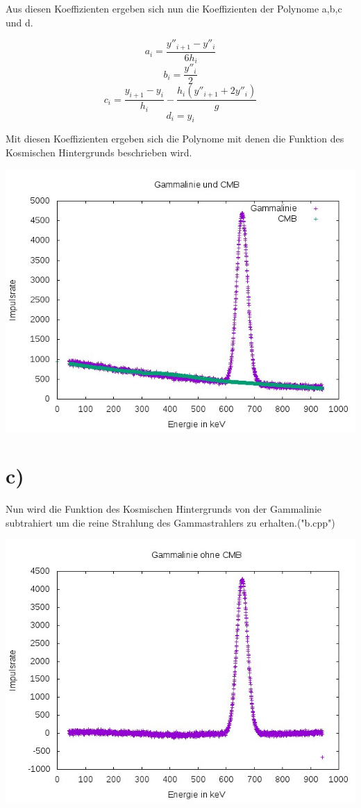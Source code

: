 \documentclass{scrreprt}
\begin{document}
Aus diesen Koeffizienten ergeben sich nun die Koeffizienten der Polynome a,b,c und d.

\[a_i = \frac{y''_{i+1}-y''_i}{6h_i}\]
\[b_i = \frac{y''_i}{2}\]
\[c_i = \frac{y_{i+1}-y_i}{h_i}-\frac{h_i(y''_{i+1}+2y''_i)}{g}\]
\[d_i = y_i\]

Mit diesen Koeffizienten ergeben sich die Polynome mit denen die Funktion des Kosmischen Hintergrunds beschrieben wird.

\begin{center}
	\includegraphics*[scale=0.7]{b.jpeg}
\end{center}
\section*{c)}
Nun wird die Funktion des Kosmischen Hintergrunds von der Gammalinie subtrahiert um die reine Strahlung des Gammastrahlers zu erhalten.("b.cpp")

\begin{center}
	\includegraphics*[scale=0.7]{c.jpeg}
\end{center}
\end{document}

